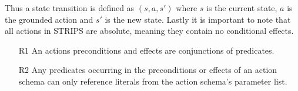 \documentclass[Master.tex]{subfiles}
\begin{document}
Thus a state transition is defined as $(s,a,s')$ where $s$ is the
current state, $a$ is the grounded action and $s'$ is the new state.
Lastly it is important to note that all actions in STRIPS are absolute,
meaning they contain no conditional effects.

\begin{enumerate}
    \item[R1] An actions preconditions and effects are conjunctions of predicates.
    \item[R2] Any predicates occurring in the preconditions or effects of an action schema can only reference literals from the action schema's parameter list.
\end{enumerate}

% 
%
% 
%
% 
%
% 
\end{document}
